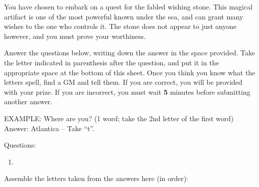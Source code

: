 \documentclass[green]{NeptuneBall}
\begin{document}
\name{\gWS{}}

You have chosen to embark on a quest for the fabled wishing stone. This magical artifact is one of the most powerful known under the sea, and can grant many wishes to the one who controls it. The stone does not appear to just anyone however, and you must prove your worthiness.

Answer the questions below, writing down the answer in the space provided. Take the letter indicated in parenthesis after the question, and put it in the appropriate space at the bottom of this sheet. Once you think you know what the letters spell, find a GM and tell them. If you are correct, you will be provided with your prize. If you are incorrect, you must wait {\bf 5} minutes before submitting another answer.

EXAMPLE:
Where are you? (1 word; take the 2nd letter of the first word)\\
Answer: Atlantica  -- Take ``t''.
		

Questions:
\begin{enumerate}
\item
\end{enumerate}

Assemble the letters taken from the answers here (in order):

\underline{\hspace{.5cm}} \underline{\hspace{.5cm}} \underline{\hspace{.5cm}} \underline{\hspace{.5cm}} \underline{\hspace{.5cm}} \underline{\hspace{.5cm}} \underline{\hspace{.5cm}} \underline{\hspace{.5cm}} \underline{\hspace{.5cm}} \underline{\hspace{.5cm}} \underline{\hspace{.5cm}} \underline{\hspace{.5cm}} \underline{\hspace{.5cm}} \underline{\hspace{.5cm}}
\end{document}
